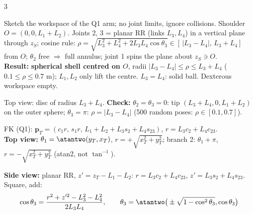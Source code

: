 \begin{multicols}{3}
\begin{examq}
Sketch the workspace of the Q1 arm; no joint limits, ignore collisions.
\solution
Shoulder $O=(0,0,L_1{+}L_2)$. Joints 2, 3 = planar RR (links $L_3,L_4$) in a vertical plane through $z_S$; cosine rule: $\rho=\sqrt{L_3^2+L_4^2+2L_3L_4\cos\theta_3}\in[\,|L_3{-}L_4|,\,L_3{+}L_4]$ from $O$; $\theta_2$ free $\Rightarrow$ full annulus; joint 1 spins the plane about $z_S\ni O$.\\
\textbf{Result:} \textbf{spherical shell centred on $O$}, radii $|L_3{-}L_4|\le\rho\le L_3{+}L_4$ ($0.1\le\rho\le0.7$ m); $L_1,L_2$ only lift the centre. $L_3=L_4$: solid ball. Dexterous workspace empty.
\begin{center}
\end{center}
Top view: disc of radius $L_3{+}L_4$. \textbf{Check:} $\theta_2=\theta_3=0$: tip $(L_3{+}L_4,0,L_1{+}L_2)$ on the outer sphere; $\theta_3=\pi$: $\rho=|L_3{-}L_4|$ (500 random poses: $\rho\in[0.1,0.7]$). \chk
\end{examq}
\begin{examq}
\solution
FK (Q1): $\mathbf p_T=(c_1r,\,s_1r,\,L_1{+}L_2{+}L_3s_2{+}L_4s_{23})$, $r=L_3c_2+L_4c_{23}$.\\
\textbf{Top view:} $\theta_1=\atantwo(y_T,x_T)$, $r=+\sqrt{x_T^2+y_T^2}$; branch 2: $\theta_1+\pi$, $r=-\sqrt{x_T^2+y_T^2}$ (atan2, not $\tan^{-1}$).\\
\end{examq}
\begin{examq}
\textbf{Side view:} planar RR, $z'=z_T-L_1-L_2$: $r=L_3c_2+L_4c_{23}$, $z'=L_3s_2+L_4s_{23}$. Square, add:
\[\cos\theta_3=\frac{r^2+z'^2-L_3^2-L_4^2}{2L_3L_4},\qquad\theta_3=\atantwo\big(\pm\sqrt{1-\cos^2\theta_3},\cos\theta_3\big)\]

\end{examq}
\end{multicols}
